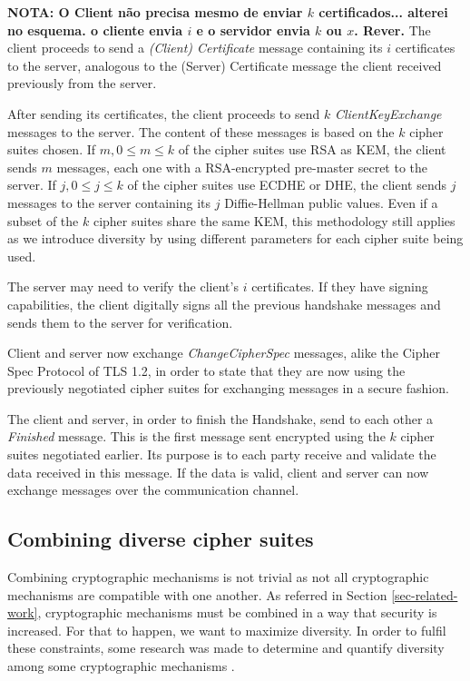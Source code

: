 \documentclass{sig-alternate-05-2015}
\begin{document}
\textbf{NOTA: O Client n\~ao precisa mesmo de enviar $k$ certificados... alterei no esquema. o cliente envia $i$ e o servidor envia $k$ ou $x$. Rever.}
The client proceeds to send a \textit{(Client) Certificate} message containing its $i$ certificates to the server, analogous to the (Server) Certificate message the client received previously from the server.

After sending its certificates, the client proceeds to send $k$ \textit{ClientKeyExchange} messages to the server. The content of these messages is based on the $k$ cipher suites chosen. If $m, 0 \leq m \leq k$ of the cipher suites use RSA as KEM, the client sends $m$ messages, each one with a RSA-encrypted pre-master secret to the server. If $j, 0 \leq j \leq k$ of the cipher suites use ECDHE or DHE, the client sends $j$ messages to the server containing its $j$ Diffie-Hellman public values. Even if a subset of the $k$ cipher suites share the same KEM, this methodology still applies as we introduce diversity by using different parameters for each cipher suite being used.

The server may need to verify the client's $i$ certificates. If they have signing capabilities, the client digitally signs all the previous handshake messages and sends them to the server for verification.

Client and server now exchange \textit{ChangeCipherSpec} messages, alike the Cipher Spec Protocol of TLS 1.2, in order to state that they are now using the previously negotiated cipher suites for exchanging messages in a secure fashion.

The client and server, in order to finish the Handshake, send to each other a \textit{Finished} message. This is the first message sent encrypted using the $k$ cipher suites negotiated earlier. Its purpose is to each party receive and validate the data received in this message. If the data is valid, client and server can now exchange messages over the communication channel.

\subsection{Combining diverse cipher suites}

Combining cryptographic mechanisms is not trivial as not all cryptographic mechanisms are compatible with one another. As referred in Section \ref{sec-related-work}, cryptographic mechanisms must be combined in a way that security is increased. For that to happen, we want to maximize diversity.
In order to fulfil these constraints, some research was made to determine and quantify diversity among some cryptographic mechanisms \cite{CarvalhoThesis14}.
\end{document}
